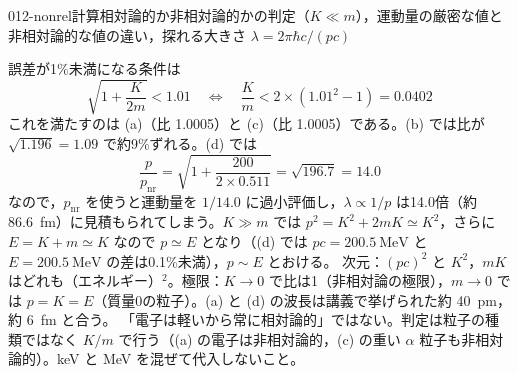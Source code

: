 \documentclass[uplatex,dvipdfmx,a4paper,11pt]{jsarticle}
\begin{document}
\begin{mondai}{012-nonrel}{計算}{相対論的か非相対論的かの判定（$K\ll m$），運動量の厳密な値と非相対論的な値の違い，探れる大きさ $\lambda=2\pi\hbar c/(pc)$}
\begin{tadashii}
 誤差が1\%未満になる条件は
\[ \sqrt{1+\frac{K}{2m}}<1.01\quad\Longleftrightarrow\quad \frac{K}{m}<2\times(1.01^2-1)=0.0402 \]
これを満たすのは (a)（比 1.0005）と (c)（比 1.0005）である。(b) では比が $\sqrt{1.196}=1.09$ で約9\%ずれる。(d) では
\[ \frac{p}{p_{\mathrm{nr}}}=\sqrt{1+\frac{200}{2\times0.511}}=\sqrt{196.7}=14.0 \]
なので，$p_{\mathrm{nr}}$ を使うと運動量を $1/14.0$ に過小評価し，$\lambda\propto1/p$ は14.0倍（約 \qty{86.6}{\femto\metre}）に見積もられてしまう。$K\gg m$ では $p^2=K^2+2mK\simeq K^2$，さらに $E=K+m\simeq K$ なので $p\simeq E$ となり（(d) では $pc=\qty{200.5}{\mega\electronvolt}$ と $E=\qty{200.5}{\mega\electronvolt}$ の差は0.1\%未満），$p\sim E$ とおける。
\kenzan 次元：$(pc)^2$ と $K^2$，$mK$ はどれも（エネルギー）$^2$。極限：$K\to0$ で比は1（非相対論の極限），$m\to0$ では $p=K=E$（質量0の粒子）。(a) と (d) の波長は講義で挙げられた約 \qty{40}{\pico\metre}，約 \qty{6}{\femto\metre} と合う。
\tsumazuki 「電子は軽いから常に相対論的」ではない。判定は粒子の種類ではなく $K/m$ で行う（(a) の電子は非相対論的，(c) の重い $\alpha$ 粒子も非相対論的）。\unit{\kilo\electronvolt} と \unit{\mega\electronvolt} を混ぜて代入しないこと。
\end{tadashii}
\end{mondai}
\end{document}
